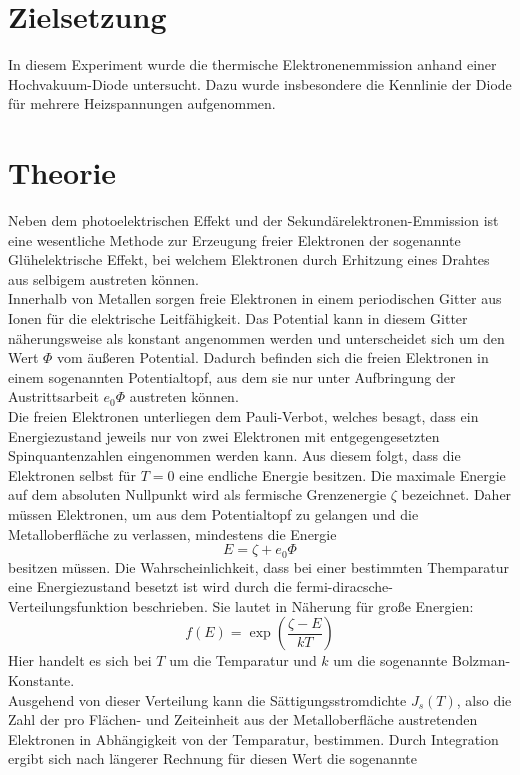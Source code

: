 \section{Zielsetzung}
In diesem Experiment wurde die thermische Elektronenemmission anhand einer Hochvakuum-Diode untersucht. Dazu wurde insbesondere die 
Kennlinie der Diode für mehrere Heizspannungen aufgenommen.
\section{Theorie}
Neben dem photoelektrischen Effekt und der Sekundärelektronen-Emmission ist eine wesentliche Methode zur Erzeugung freier Elektronen der
sogenannte Glühelektrische Effekt, bei welchem Elektronen durch Erhitzung eines Drahtes aus selbigem austreten können. \\
Innerhalb von Metallen sorgen freie Elektronen in einem periodischen Gitter aus Ionen für die elektrische Leitfähigkeit. Das Potential 
kann in diesem Gitter näherungsweise als konstant angenommen werden und unterscheidet sich um den Wert $\Phi$ vom äußeren Potential.
Dadurch befinden sich die freien Elektronen in einem sogenannten Potentialtopf, aus dem sie nur unter Aufbringung der Austrittsarbeit
$e_0\Phi$ austreten können. \\
Die freien Elektronen unterliegen dem Pauli-Verbot, welches besagt, dass ein Energiezustand jeweils nur von zwei Elektronen mit entgegengesetzten 
Spinquantenzahlen eingenommen werden kann. Aus diesem folgt, dass die Elektronen selbst für $T=0$ eine endliche Energie besitzen. 
Die maximale Energie auf dem absoluten Nullpunkt wird als fermische Grenzenergie $\zeta$ bezeichnet. Daher müssen Elektronen, um aus dem Potentialtopf
zu gelangen und die Metalloberfläche zu verlassen, mindestens die Energie
\begin{equation}
E=\zeta+e_0\Phi
\end{equation}
besitzen müssen. Die Wahrscheinlichkeit, dass bei einer bestimmten Themparatur eine Energiezustand besetzt ist wird durch die 
fermi-diracsche-Verteilungsfunktion beschrieben. Sie lautet in Näherung für große Energien:
\begin{equation}
f(E)=\exp(\frac{\zeta-E}{kT})
\end{equation}
Hier handelt es sich bei $T$ um die Temparatur und $k$ um die sogenannte Bolzman-Konstante. \\
Ausgehend von dieser Verteilung kann die Sättigungsstromdichte $J_s(T)$, also die Zahl der pro Flächen- und Zeiteinheit aus der Metalloberfläche
austretenden Elektronen in Abhängigkeit von der Temparatur, bestimmen. Durch Integration ergibt sich nach längerer Rechnung für diesen Wert die sogenannte
